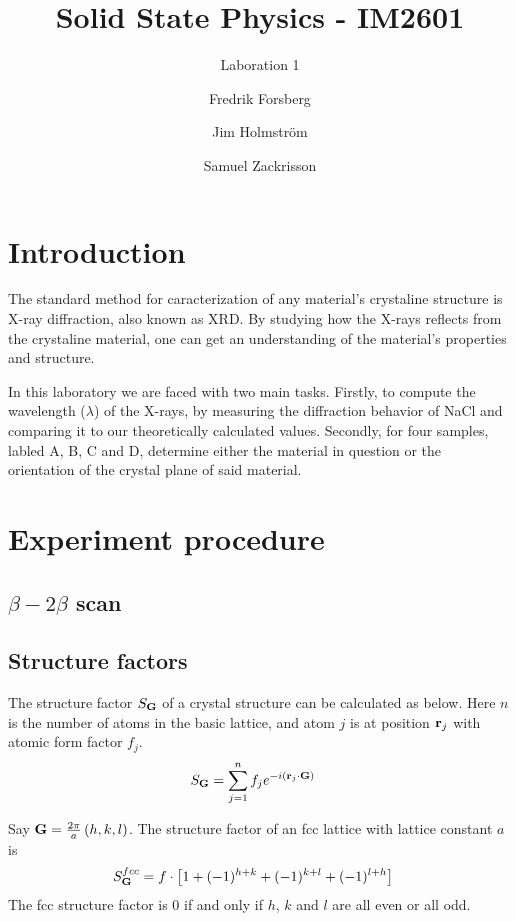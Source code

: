 \documentclass[a4paper,twoside=false,abstract=false,numbers=noenddot,
titlepage=false,headings=small,parskip=half,version=last]{scrartcl}
\title{Solid State Physics - IM2601}
\subtitle{Laboration 1}
\author[1]{Fredrik Forsberg}
\author[1]{Jim Holmström}
\author[1]{Samuel Zackrisson}
\affil[1]{Engineering Physics, Royal Institute of Technology}
\affil[1]{\{fforsber, jimho, samuelz\}@kth.se}
\begin{document}
\maketitle
\thispagestyle{empty}

\section{Introduction}
The standard method for caracterization of any material's crystaline structure is X-ray diffraction, also known as XRD. By studying how the X-rays reflects from the crystaline material, one can get an understanding of the material's properties and structure.

In this laboratory we are faced with two main tasks. Firstly, to compute the wavelength ($\lambda$) of the X-rays, by measuring the diffraction behavior of NaCl and comparing it to our theoretically calculated values. Secondly, for four samples, labled A, B, C and D, determine either the material in question or the orientation of the crystal plane of said material.

\section{Experiment procedure}
\subsection{$\beta-2\beta$ scan}

\subsection{Structure factors}
The structure factor $S_{\bold{G}}$ of a crystal structure can be calculated as below. Here $n$ is the number of atoms in the basic lattice, and atom $j$ is at position $\bold{r}_j$ with atomic form factor $f_j$.\\
\begin{align}
S_{\bold{G}} &= \sum^n_{j=1} f_j e^{-i \left( \bold{r}_j \cdot \bold{G}\right)}
\end{align}

Say $\bold{G} = \frac{2\pi}{a}\left( h,k,l \right)$. The structure factor of an fcc lattice with lattice constant $a$ is 
\begin{align}
S^{fcc}_{\bold{G}} &= f\cdot \left[ 1 + (-1)^{h+k} + (-1)^{k+l} + (-1)^{l+h}\right]
\end{align}
The fcc structure factor is 0 if and only if $h$, $k$ and $l$ are all even or all odd.\\
\end{document}
